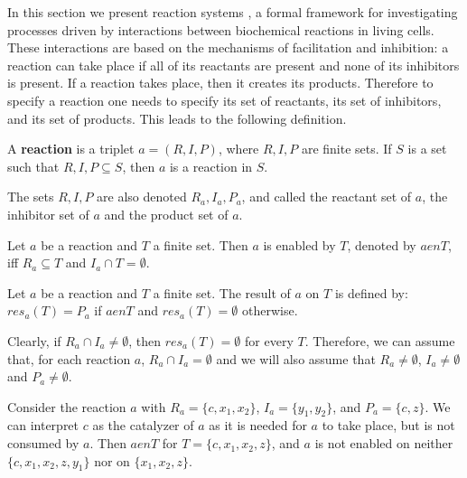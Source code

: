 In this section we present reaction systems \cite{Rozenberg09Reaction}, a formal framework for investigating processes driven by interactions between biochemical reactions in living cells. These interactions are
based on the mechanisms of facilitation and inhibition: a reaction can take place if all of its reactants are present and none of its inhibitors is present. If a reaction takes place, then it creates its products. Therefore to specify a reaction one needs to specify its set of reactants, its set of inhibitors, and its set of products. This leads to the following definition.

\begin{definition}
  A {\bf reaction} is a triplet $a=(R,I,P)$, where $R, I, P$ are finite sets. If $S$ is a set such that $R,I,P\subseteq S$, then $a$ is a reaction in $S$.
\end{definition}

The sets $R, I, P$ are also denoted $R_a, I_a, P_a$, and called the reactant set of $a$, the inhibitor set of $a$ and the product set of $a$.

\begin{definition}
  Let $a$ be a reaction and $T$ a finite set. Then $a$ is enabled by $T$, denoted by $a \mathrel{en} T$, iff $R_a\subseteq T$ and $I_a\cap T = \emptyset$.
\end{definition}

\begin{definition}
  Let $a$ be a reaction and $T$ a finite set. The result of $a$ on $T$ is defined by: $res_a(T) = P_a$ if $a \mathrel{en} T$ and $res_a(T) = \emptyset$ otherwise.
\end{definition}

Clearly, if $R_a\cap I_a\neq\emptyset$, then $res_a(T)=\emptyset$ for every $T$. Therefore, we can assume that, for each reaction $a$, $R_a\cap I_a = \emptyset$ and we will also assume that $R_a\neq\emptyset$, $I_a\neq\emptyset$ and $P_a\neq\emptyset$.

\begin{example}
  Consider the reaction $a$ with $R_a = \{c, x_1, x_2\}$, $I_a = \{y_1, y_2\}$, and $P_a = \{c, z\}$. We can interpret $c$ as the catalyzer of $a$ as it is needed for $a$ to take place, but is not consumed by $a$. Then $a \mathrel{en} T$ for $T = \{c, x_1, x_2, z\}$, and $a$ is not enabled on neither $\{c, x_1, x_2, z, y_1\}$ nor on $\{x_1, x_2, z\}$.
\end{example}



